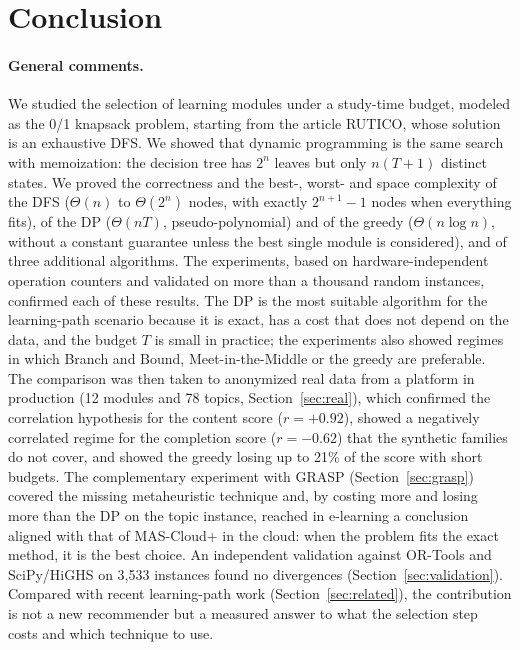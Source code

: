 \section{Conclusion}\label{sec:conclusion}

\paragraph{General comments.} We studied the selection of learning modules under a study-time budget, modeled as the 0/1 knapsack problem, starting from the article RUTICO, whose solution is an exhaustive DFS. We showed that dynamic programming is the same search with memoization: the decision tree has $2^n$ leaves but only $n(T+1)$ distinct states. We proved the correctness and the best-, worst- and space complexity of the DFS ($\Theta(n)$ to $\Theta(2^n)$ nodes, with exactly $2^{n+1}-1$ nodes when everything fits), of the DP ($\Theta(nT)$, pseudo-polynomial) and of the greedy ($\Theta(n\log n)$, without a constant guarantee unless the best single module is considered), and of three additional algorithms. The experiments, based on hardware-independent operation counters and validated on more than a thousand random instances, confirmed each of these results. The DP is the most suitable algorithm for the learning-path scenario because it is exact, has a cost that does not depend on the data, and the budget $T$ is small in practice; the experiments also showed regimes in which Branch and Bound, Meet-in-the-Middle or the greedy are preferable. The comparison was then taken to anonymized real data from a platform in production (12 modules and 78 topics, Section~\ref{sec:real}), which confirmed the correlation hypothesis for the content score ($r=+0.92$), showed a negatively correlated regime for the completion score ($r=-0.62$) that the synthetic families do not cover, and showed the greedy losing up to 21\% of the score with short budgets. The complementary experiment with GRASP (Section~\ref{sec:grasp}) covered the missing metaheuristic technique and, by costing more and losing more than the DP on the topic instance, reached in e-learning a conclusion aligned with that of MAS-Cloud+ in the cloud: when the problem fits the exact method, it is the best choice. An independent validation against OR-Tools and SciPy/HiGHS on 3,533 instances found no divergences (Section~\ref{sec:validation}). Compared with recent learning-path work (Section~\ref{sec:related}), the contribution is not a new recommender but a measured answer to what the selection step costs and which technique to use.

